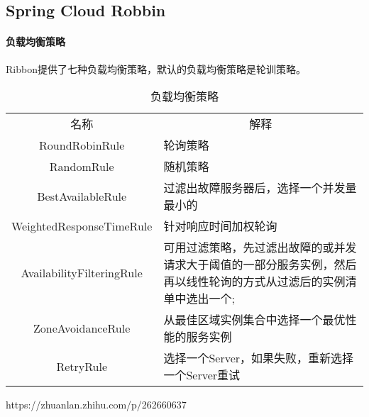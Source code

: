 \documentclass[../../../interview-questions.tex]{subfiles}
\begin{document}
\subsection{Spring Cloud Robbin}

\paragraph{负载均衡策略}

Ribbon提供了七种负载均衡策略，默认的负载均衡策略是轮训策略。

\begin{table}[htbp]
	\caption{负载均衡策略}
	\label{table:loadbalance}
	\begin{center}
		\begin{tabular}{cp{6cm}}
			\hline
			\multirow{1}{*}{名称}
			& \multicolumn{1}{c}{解释} \\			
			\cline{1-2}
			RoundRobinRule &  轮询策略            \\
			\hline
			RandomRule &  随机策略            \\
			\hline
			BestAvailableRule	 &  过滤出故障服务器后，选择一个并发量最小的            \\
			\hline	
            WeightedResponseTimeRule &  针对响应时间加权轮询            \\
			\hline
            AvailabilityFilteringRule &  可用过滤策略，先过滤出故障的或并发请求大于阈值的一部分服务实例，然后再以线性轮询的方式从过滤后的实例清单中选出一个;            \\
			\hline
            ZoneAvoidanceRule &  从最佳区域实例集合中选择一个最优性能的服务实例            \\
			\hline	
            RetryRule &  选择一个Server，如果失败，重新选择一个Server重试           \\
			\hline					
		\end{tabular}	
	\end{center}
\end{table}

https://zhuanlan.zhihu.com/p/262660637
\end{document}
